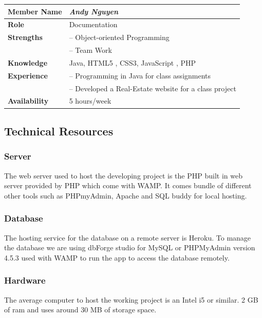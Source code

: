 \documentclass[12pt]{article}
\begin{document}
%
\vspace{3mm}
%
\begin{center}
\begin{tabular}{ p{2.7cm} | p{9cm} }
\hline
\textbf{Member Name}	&	\textit{\textbf{Andy Nguyen}}	\\ \hline \hline
\textbf{Role}		&	Documentation	\\ \hline
\textbf{Strengths}	&	-- Object-oriented Programming	\\
					&	-- Team Work	\\ \hline
\textbf{Knowledge}	&	Java, HTML5 , CSS3, JavaScript , PHP	\\ \hline
\textbf{Experience}	&	-- Programming in Java for class assignments	\\
					&	-- Developed a Real-Estate website for a class project	\\ \hline
\textbf{Availability}	&	5 hours/week	\\ \hline
\end{tabular}
\end{center}
%
\vspace{3mm}
%
\subsection{Technical Resources}

\subsubsection{Server}

The web server used to host the developing project is the PHP built in web server provided by PHP which come with WAMP. It comes bundle of different other tools such as PHPmyAdmin, Apache and SQL buddy for local hosting.
\subsubsection{Database}

 The hosting service for the database on a remote server is Heroku. To manage the database we are using dbForge studio for MySQL or PHPMyAdmin version 4.5.3 used with WAMP to run the app to access the database remotely.

\subsubsection{Hardware}

 The average computer to host the working project is an Intel i5 or similar. 2 GB of ram and uses around 30 MB of storage space. 
\end{document}
